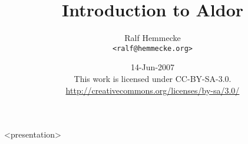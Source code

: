 



{
}
{
  \usepackage{hyperref}
  \usepackage{fullpage}
}

\usepackage[english]{babel}
\usepackage[latin1]{inputenc}
\usepackage{times}
\usepackage[T1]{fontenc}

\title{Introduction to Aldor}

\author[Ralf Hemmecke]%
       {Ralf Hemmecke \\\footnotesize{\texttt{<ralf@hemmecke.org>}}}
\date{14-Jun-2007\\
  \footnotesize{This work is licensed under CC-BY-SA-3.0.\\
    \url{http://creativecommons.org/licenses/by-sa/3.0/}}%
}

\subject{Introduction to Aldor}

\usepackage{listings}
%
  {\footnotesize\ttfamily}%
  {}
%
  {\footnotesize\ttfamily}%
  {}
\usepackage{verbatim}
\newenvironment{smallverbatim}%
   {\footnotesize\verbatim}%
   {\endverbatim}



\maketitle
\begin{frame}<presentation>
  \titlepage
\end{frame}

